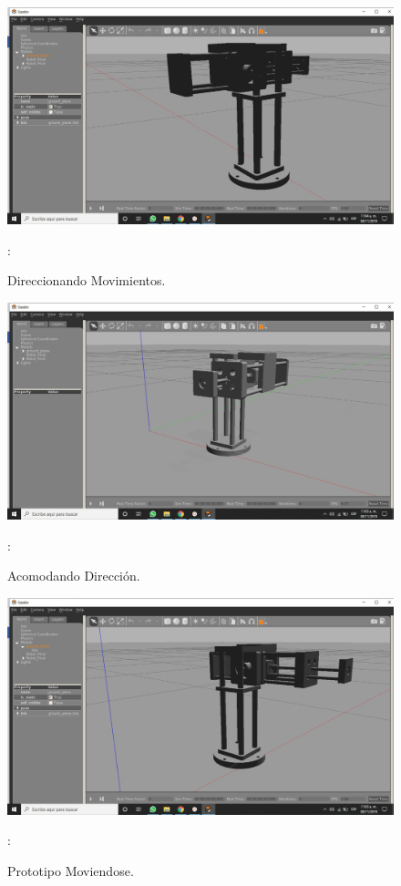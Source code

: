 \documentclass[11pt,a4paper,oldfontcommands,oneside]{memoir}
\begin{document}
\begin{figure}
\begin{center}
\includegraphics[scale=.30]{103.jpeg}
\end{center}
\caption{Direccionando Movimientos.}
\label{blender}:
\end{figure}

\begin{figure}
\begin{center}
\includegraphics[scale=.30]{105.jpeg}
\end{center}
\caption{Acomodando Dirección.}
\label{blender}:
\end{figure}

\begin{figure}
\begin{center}
\includegraphics[scale=.30]{104.jpeg}
\end{center}
\caption{Prototipo Moviendose.}
\label{blender}:
\end{figure}
\end{document}
